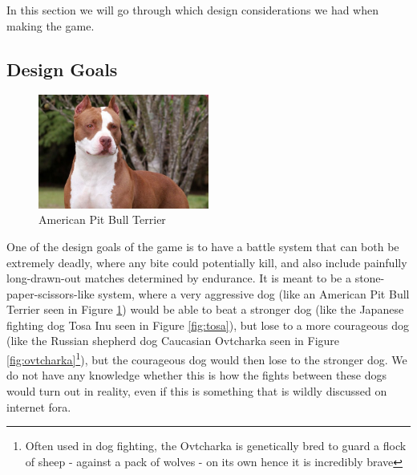 In this section we will go through which design considerations we had when making the game.\

\subsection{Design Goals}
\label{designGoals}

\begin{figure} 
	\centering
    \includegraphics[width=0.5\textwidth]{pitbull.jpg}
    \caption{American Pit Bull Terrier}
    \label{fig:pitbull}
\end{figure}

One of the design goals of the game is to have a battle system that can both be extremely deadly, where any bite could potentially kill, and also include painfully long-drawn-out matches determined by endurance. It is meant to be a stone-paper-scissors-like system, where a very aggressive dog (like an American Pit Bull Terrier seen in Figure \ref{fig:pitbull}) would be able to beat a stronger dog (like the Japanese fighting dog Tosa Inu seen in Figure \ref{fig:tosa}), but lose to a more courageous dog (like the Russian shepherd dog Caucasian Ovtcharka seen in Figure \ref{fig:ovtcharka}\footnote{Often used in dog fighting, the Ovtcharka is genetically bred to guard a flock of sheep - against a pack of wolves - on its own hence it is incredibly brave}), but the courageous dog would then lose to the stronger dog. We do not have any knowledge whether this is how the fights between these dogs would turn out in reality, even if this is something that is wildly discussed on internet fora.\

